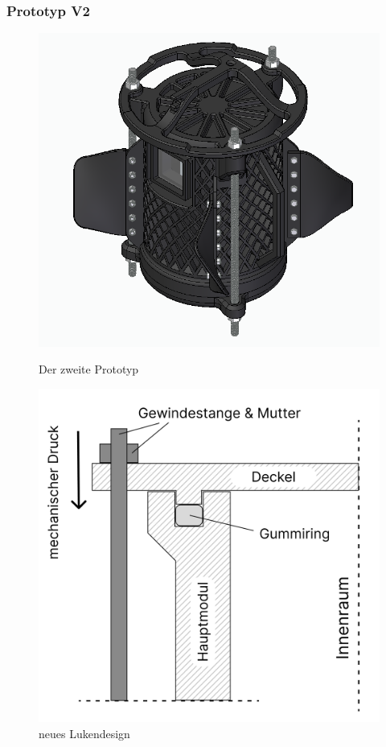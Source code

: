 \documentclass[11pt]{article}
\begin{document}
\endgroup
\newpage
\subsubsection{Prototyp V2}
\begingroup
\begin{figure}
\centering
  \includegraphics[width=\linewidth]{Hauptmodul2.png}
  \caption{Der zweite Prototyp}
  \vspace{0.5cm}
  \includegraphics[width=\linewidth]{Luke.png}
  \caption{neues Lukendesign}
\end{figure}
\HauptmodulZwei
\end{document}
